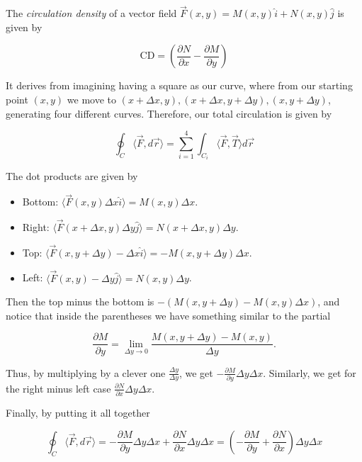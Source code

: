 The \emph{circulation density} of a vector field \(\vec{F}(x,y) = M(x,y)\hat{i} + N(x,y)\hat{j}\) is given by 

\[
    \mathrm{CD} = \left(\frac{\partial N}{\partial x}- \frac{\partial M}{\partial y}\right)
\]

It derives from imagining having a square as our curve, where from our starting point \((x,y)\) we move to \((x + \Delta x, y), (x + \Delta x, y + \Delta y), 
(x, y + \Delta y)\), generating four different curves. Therefore, our total circulation is given by 

\[
    \oint_C \langle \vec{F}, d\vec{r} \rangle = \sum_{i = 1}^{4} \int_{C_i} \langle \vec{F}, \vec{T} \rangle d\vec{r}
\]

The dot products are given by 

\begin{itemize}

    \item Bottom: \(\langle \vec{F}(x,y) \Delta x \hat{i}\rangle = M(x,y)\Delta x\).
    
    \item Right: \(\langle \vec{F}(x + \Delta x, y ) \Delta y \hat{j}\rangle = N(x + \Delta x, y)\Delta y \).

    \item Top: \(\langle \vec{F}(x,y + \Delta y) -\Delta x \hat{i}\rangle = -M(x,y + \Delta y)\Delta x\).

    \item Left: \(\langle \vec{F}(x, y) -\Delta y \hat{j}\rangle = N(x , y)\Delta y\).

\end{itemize}

Then the top minus the bottom is \(- (M(x ,y + \Delta y) - M(x,y)\Delta x)\), and notice that inside the parentheses we have something 
similar to the partial 

\[
    \frac{\partial M}{\partial y} = \lim_{\Delta y \to 0} \frac{M(x,y + \Delta y) - M(x,y)}{\Delta y}.
\]

Thus, by multiplying by a clever one \(\frac{\Delta y}{\Delta y}\), we get \(- \frac{\partial M}{\partial y} \Delta y \Delta x \). Similarly, we 
get for the right minus left case \(\frac{\partial N}{\partial x} \Delta y \Delta x\). 

Finally, by putting it all together 

\[
     \oint_C \langle \vec{F}, d\vec{r} \rangle =  - \frac{\partial M}{\partial y} \Delta y \Delta x + \frac{\partial N}{\partial x} \Delta y \Delta x = 
     \left(-\frac{\partial M}{\partial y} + \frac{\partial N}{\partial x}\right) \Delta y \Delta x  
\]

